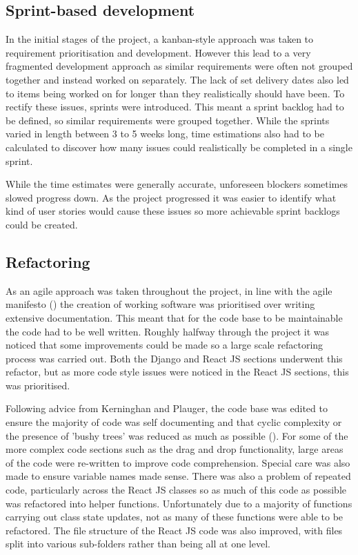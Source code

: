 \documentclass[l4proj.tex]{subfiles}
\begin{document}
\subsection{Sprint-based development}
In the initial stages of the project, a kanban-style approach was taken to requirement prioritisation and development. However this lead to a very fragmented development approach as similar requirements were often not grouped together and instead worked on separately. The lack of set delivery dates also led to items being worked on for longer than they realistically should have been. To rectify these issues, sprints were introduced. This meant a sprint backlog had to be defined, so similar requirements were grouped together. While the sprints varied in length between 3 to 5 weeks long, time estimations also had to be calculated to discover how many issues could realistically be completed in a single sprint. 

While the time estimates were generally accurate, unforeseen blockers sometimes slowed progress down. As the project progressed it was easier to identify what kind of user stories would cause these issues so more achievable sprint backlogs could be created. 


\subsection{Refactoring}
 As an agile approach was taken throughout the project, in line with the agile manifesto (\cite{Kent2001(manifesto)}) the creation of working software was prioritised over writing extensive documentation. This meant that for the code base to be maintainable the code had to be well written. Roughly halfway through the project it was noticed that some improvements could be made so a large scale refactoring process was carried out. Both the Django and React JS sections underwent this refactor, but as more code style issues were noticed in the React JS sections, this was prioritised.

 Following advice from Kerninghan and Plauger, the code base was edited to ensure the majority of code was self documenting and that cyclic complexity or the presence of 'bushy trees' was reduced as much as possible (\cite{Kernignhan1974}). For some of the more complex code sections such as the drag and drop functionality, large areas of the code were re-written to improve code comprehension. Special care was also made to ensure variable names made sense. There was also a problem of repeated code, particularly across the React JS classes so as much of this code as possible was refactored into helper functions. Unfortunately due to a majority of functions carrying out class state updates, not as many of these functions were able to be refactored. The file structure of the React JS code was also improved, with files split into various sub-folders rather than being all at one level. 
\end{document}
